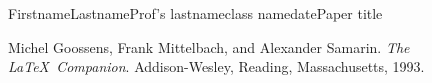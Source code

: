 \documentclass[12pt,letterpaper]{article}
\begin{document}
\begin{mla}{Firstname}{Lastname}{Prof's lastname}{class name}{date}{Paper title}
\Blindtext %

\begin{workscited}
\bibent Michel Goossens, Frank Mittelbach, and Alexander Samarin. 
\textit{The \LaTeX\ Companion}. 
Addison-Wesley, Reading, Massachusetts, 1993.
\end{workscited}
\end{mla}
\end{document}
